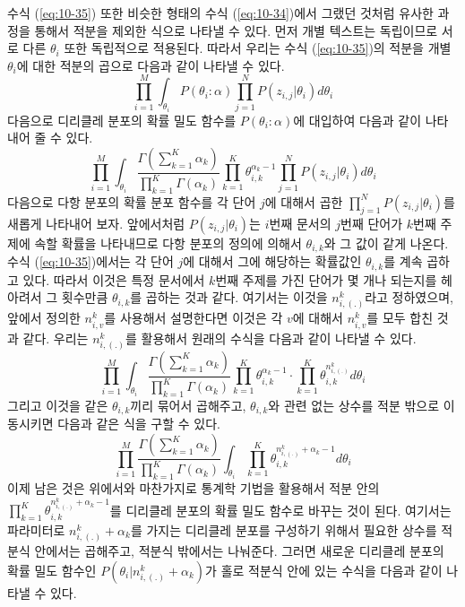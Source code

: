 \documentclass[a4paper]{oblivoir}
\begin{document}
수식 (\ref{eq:10-35}) 또한 비슷한 형태의 수식 (\ref{eq:10-34})에서 그랬던 것처럼 유사한 과정을 통해서 적분을 제외한 식으로 나타낼 수 있다. 먼저 개별 텍스트는 독립이므로 서로 다른 $\theta_{i}$ 또한 독립적으로 적용된다. 따라서 우리는 수식 (\ref{eq:10-35})의 적분을 개별 $\theta_{i}$에 대한 적분의 곱으로 다음과 같이 나타낼 수 있다.
\begin{equation}
\prod_{i=1}^{M} \int_{\theta_{i}} P(\theta_i:\alpha) \prod_{j=1}^{N} P(z_{i,j}|\theta_i) d\theta_{i} 
\label{eq:10-43}
\end{equation}
다음으로 디리클레 분포의 확률 밀도 함수를 $P(\theta_i:\alpha)$에 대입하여 다음과 같이 나타내어 줄 수 있다.  
\begin{equation}
\prod_{i=1}^{M} \int_{\theta_{i}} \frac{\Gamma(\sum_{k=1}^{K} \alpha_{k})}{\prod_{k=1}^{K} \Gamma(\alpha_{k})}  \prod_{k=1}^{K} \theta_{i,k}^{\alpha_{k}-1} \prod_{j=1}^{N} P(z_{i,j}|\theta_i) d\theta_{i} 
\label{eq:10-44}
\end{equation}
다음으로 다항 분포의 확률 분포 함수를 각 단어 $j$에 대해서 곱한 $\prod_{j=1}^{N} P(z_{i,j}|\theta_i)$를 새롭게 나타내어 보자. 앞에서처럼 $P(z_{i,j}|\theta_i)$는 $i$번째 문서의 $j$번째 단어가 $k$번째 주제에 속할 확률을 나타내므로 다항 분포의 정의에 의해서 $\theta_{i,k}$와 그 값이 같게 나온다. 수식 (\ref{eq:10-35})에서는 각 단어 $j$에 대해서 그에 해당하는 확률값인 $\theta_{i,k}$를 계속 곱하고 있다. 따라서 이것은 특정 문서에서 $k$번째 주제를 가진 단어가 몇 개나 되는지를 헤아려서 그 횟수만큼 $\theta_{i,k}$를 곱하는 것과 같다. 여기서는 이것을 $n_{i,(.)}^{k}$라고 정하였으며, 앞에서 정의한 $n_{i,v}^{k}$를 사용해서 설명한다면 이것은 각 $v$에 대해서 $n_{i,v}^{k}$를 모두 합친 것과 같다. 우리는 $n_{i,(.)}^{k}$를 활용해서 원래의 수식을 다음과 같이 나타낼 수 있다.    
\begin{equation}
\prod_{i=1}^{M}  \int_{\theta_{i}} \frac{\Gamma(\sum_{k=1}^{K} \alpha_{k})}{\prod_{k=1}^{K} \Gamma(\alpha_{k})}  \prod_{k=1}^{K} \theta_{i,k}^{\alpha_{k}-1} \cdot \prod_{k=1}^{K} \theta_{i,k}^{n^{k}_{i,(.)}} d\theta_{i} 
\label{eq:10-45}
\end{equation}
그리고 이것을 같은 $\theta_{i,k}$끼리 묶어서 곱해주고, $\theta_{i,k}$와 관련 없는 상수를 적분 밖으로 이동시키면 다음과 같은 식을 구할 수 있다.
\begin{equation}
\prod_{i=1}^{M} \frac{\Gamma(\sum_{k=1}^{K} \alpha_{k})}{\prod_{k=1}^{K} \Gamma(\alpha_{k})} \int_{\theta_{i}} \prod_{k=1}^{K} \theta_{i,k}^{n^{k}_{i,(.)}+\alpha_{k}-1} d\theta_{i} 
\label{eq:10-46}
\end{equation}
이제 남은 것은 위에서와 마찬가지로 통계학 기법을 활용해서 적분 안의 $\prod_{k=1}^{K} \theta_{i,k}^{n^{k}_{i,(.)}+\alpha_{k}-1}$를 디리클레 분포의 확률 밀도 함수로 바꾸는 것이 된다. 여기서는 파라미터로 $n^{k}_{i,(.)}+\alpha_{k}$를 가지는 디리클레 분포를 구성하기 위해서 필요한 상수를 적분식 안에서는 곱해주고, 적분식 밖에서는 나눠준다. 그러면 새로운 디리클레 분포의 확률 밀도 함수인 $P(\theta_{i}|n^{k}_{i,(.)}+\alpha_{k})$가 홀로 적분식 안에 있는 수식을 다음과 같이 나타낼 수 있다. 
\end{document}
